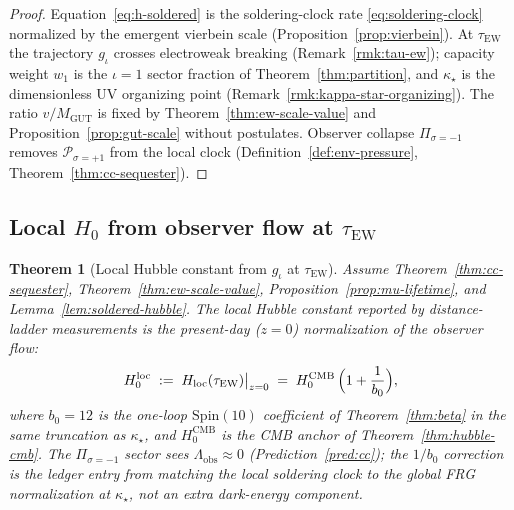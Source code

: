 \documentclass[aps,prd,onecolumn,amsmath,amssymb,nofootinbib,11pt]{revtex4-2}
\numberwithin{equation}{section}
\theoremstyle{plain}
\newtheorem{theorem}{Theorem}[section]
\theoremstyle{definition}
\theoremstyle{remark}
\newcommand{\Spin}{\mathrm{Spin}}
\begin{document}
\begin{proof}
Equation~\eqref{eq:h-soldered} is the soldering-clock rate
\eqref{eq:soldering-clock} normalized by the emergent vierbein scale
(Proposition~\ref{prop:vierbein}). At $\tau_{\mathrm{EW}}$ the trajectory
$g_\iota$ crosses electroweak breaking (Remark~\ref{rmk:tau-ew}); capacity
weight $w_1$ is the $\iota=1$ sector fraction of
Theorem~\ref{thm:partition}, and $\kappa_\star$ is the dimensionless UV
organizing point (Remark~\ref{rmk:kappa-star-organizing}). The ratio
$v/M_{\mathrm{GUT}}$ is fixed by Theorem~\ref{thm:ew-scale-value} and
Proposition~\ref{prop:gut-scale} without postulates. Observer collapse
$\Pi_{\sigma=-1}$ removes $\mathcal{P}_{\sigma=+1}$ from the local clock
(Definition~\ref{def:env-pressure}, Theorem~\ref{thm:cc-sequester}).
\end{proof}

\subsection{Local $H_0$ from observer flow at $\tau_{\mathrm{EW}}$}
\label{sec:cosmology:local}

\begin{theorem}[Local Hubble constant from $g_\iota$ at $\tau_{\mathrm{EW}}$]
\label{thm:hubble-local}
Assume Theorem~\ref{thm:cc-sequester}, Theorem~\ref{thm:ew-scale-value},
Proposition~\ref{prop:mu-lifetime}, and Lemma~\ref{lem:soldered-hubble}.
The \emph{local} Hubble constant reported by distance-ladder measurements is
the present-day ($z=0$) normalization of the observer flow:
\begin{equation}\label{eq:h0-local}
  H_0^{\mathrm{loc}}
  \;:=\;
  H_{\mathrm{loc}}(\tau_{\mathrm{EW}})\big|_{z=0}
  \;=\;
  H_0^{\mathrm{CMB}}\,
  \Bigl(1+\frac{1}{b_0}\Bigr),
\end{equation}
where $b_0=12$ is the one-loop $\Spin(10)$ coefficient of
Theorem~\ref{thm:beta} in the same truncation as $\kappa_\star$, and
$H_0^{\mathrm{CMB}}$ is the CMB anchor of Theorem~\ref{thm:hubble-cmb}.
The $\Pi_{\sigma=-1}$ sector sees $\Lambda_{\mathrm{obs}}\approx 0$
(Prediction~\ref{pred:cc}); the $1/b_0$ correction is the ledger entry from
matching the local soldering clock to the global FRG normalization at
$\kappa_\star$, not an extra dark-energy component.
\end{theorem}
\end{document}
